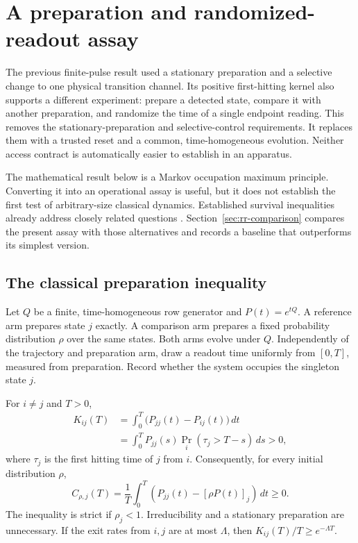 \chapter{A preparation and randomized-readout assay}
\label{ch:rr-preparation}

The previous finite-pulse result used a stationary preparation and a selective
change to one physical transition channel.  Its positive first-hitting kernel
also supports a different experiment: prepare a detected state, compare it with
another preparation, and randomize the time of a single endpoint reading.  This
removes the stationary-preparation and selective-control requirements.  It
replaces them with a trusted reset and a common, time-homogeneous evolution.
Neither access contract is automatically easier to establish in an apparatus.

The mathematical result below is a Markov occupation maximum principle.
Converting it into an operational assay is useful, but it does not establish the
first test of arbitrary-size classical dynamics.  Established survival
inequalities already address closely related questions
\cite{rrLambert2010,rrLi2012,rrZhou2015}.  Section~\ref{sec:rr-comparison} compares
the present assay with those alternatives and records a baseline that outperforms
its simplest version.

\section{The classical preparation inequality}
\label{sec:rr-preparation-theorem}

Let $Q$ be a finite, time-homogeneous row generator and $P(t)=e^{tQ}$.
A reference arm prepares state $j$ exactly.  A comparison arm prepares a fixed
probability distribution $\rho$ over the same states.  Both arms evolve under
$Q$.  Independently of the trajectory and preparation arm, draw a readout time
uniformly from $[0,T]$, measured from preparation.  Record whether the system
occupies the singleton state $j$.

\begin{theorem}
\label{thm:rr-return}
For $i\ne j$ and $T>0$,
\begin{align}
 K_{ij}(T)
 &=\int_0^T\bigl(P_{jj}(t)-P_{ij}(t)\bigr)\,dt\nonumber\\
 &=\int_0^T P_{jj}(s)\Pr_i(\tau_j>T-s)\,ds>0,
 \label{eq:rr-hitting}
\end{align}
where $\tau_j$ is the first hitting time of $j$ from $i$.
Consequently, for every initial distribution $\rho$,
\begin{equation}
 C_{\rho,j}(T)
 =\frac1T\int_0^T\left(P_{jj}(t)-[\rho P(t)]_j\right)\,dt
 \ge0.
 \label{eq:rr-classical-null}
\end{equation}
The inequality is strict if $\rho_j<1$.  Irreducibility and a stationary
preparation are unnecessary.  If the exit rates from $i,j$ are at most
$\Lambda$, then $K_{ij}(T)/T\ge e^{-\Lambda T}$.
\end{theorem}

